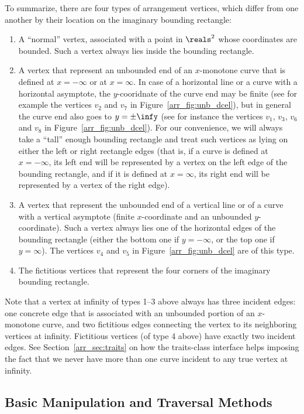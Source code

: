 To summarize, there are four types of arrangement vertices, which
differ from one another by their location on the imaginary bounding
rectangle:
\begin{enumerate}
\item
A ``normal'' vertex, associated with a point in $\reals^2$ whose
coordinates are bounded. Such a vertex always lies inside the
bounding rectangle.
\item
A vertex that represent an unbounded end of an $x$-monotone curve
that is defined at $x = -\infty$ or at $x = \infty$. In case of
a horizontal line or a curve with a horizontal asymptote, the
$y$-cooridnate of the curve end may be finite (see for example the
vertices $v_2$ and $v_7$ in Figure~\ref{arr_fig:unb_dcel}), but in
general the curve end also goes to $y = \pm\infy$ (see for instance
the vertices $v_1$, $v_3$, $v_6$ and $v_8$ in
Figure~\ref{arr_fig:unb_dcel}). For our convenience, we will always
take a ``tall'' enough bounding rectangle and treat such vertices as
lying on either the left or right rectangle edges (that is, if a curve
is defined at $x = -\infty$, its left end will be represented by
a vertex on the left edge of the bounding rectangle, and if it is
defined at $x = \infty$, its right end will be represented by a
vertex of the right edge).
\item
A vertex that represent the unbounded end of a vertical line or of a
curve with a vertical asymptote (finite $x$-coordinate and an
unbounded $y$-coordinate). Such a vertex always lies one of the
horizontal edges of the bounding rectangle (either the bottom one if
$y = -\infty$, or the top one if $y = \infty$). The vertices $v_4$
and $v_5$ in Figure~\ref{arr_fig:unb_dcel} are of this type.
\item
The fictitious vertices that represent the four corners of the
imaginary bounding rectangle.
\end{enumerate}
Note that a vertex at infinity of types 1--3 above always has
three incident edges: one concrete edge that is associated with an
unbounded portion of an $x$-monotone curve, and two fictitious edges
connecting the vertex to its neighboring vertices at infinity.
Fictitious vertices (of type 4 above) have exactly two incident edges.
See Section~\ref{arr_sec:traits} on how the traits-class interface
helps imposing the fact that we never have more than one curve
incident to any true vertex at infinity.

\subsection{Basic Manipulation and Traversal Methods\label{arr_ssec:unb_basic}}

